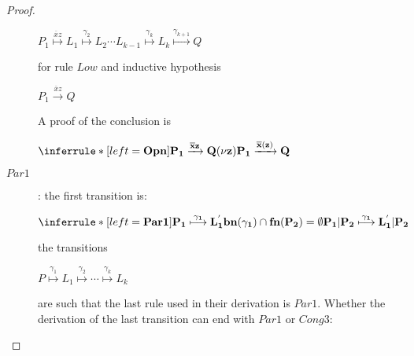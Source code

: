 \begin{proposition}
\begin{proof}
\begin{description}
\begin{center}
		  $P_{1} \stackrel{\overline{x}z}{\longmapsto} L_{1} \stackrel{\gamma_{2}}{\longmapsto} L_{2} \cdots L_{k-1} \stackrel{\gamma_{k}}{\longmapsto} L_{k}\stackrel{\gamma_{k+1}}{\longmapsto} Q$ 
		\end{center}
		for rule $Low$ and inductive hypothesis
		\begin{center}
		  $P_{1} \xrightarrow{\overline{x}z} Q$ 
		\end{center}
		A proof of the conclusion is
		\begin{center}
		  $\inferrule* [left=\bf{Opn}]{
		    P_{1} \xrightarrow{\overline{x}z} Q
		  }{
		    (\nu z)P_{1} \xrightarrow{\overline{x}(z)} Q
		  }$ 
		\end{center}
	      \item[$Par1$]: 
		the first transition is:
		\begin{center}
		  $\inferrule* [left=\bf{Par1}]{
			P_{1} \stackrel{\gamma_{1}}{\longmapsto} L_{1}^{'}
		      \\
			bn(\gamma_{1})\cap fn(P_{2})=\emptyset
		    }{
		      P_{1}|P_{2} \stackrel{\gamma_{1}}{\longmapsto} L_{1}^{'}|P_{2}
		  }$
		\end{center}
		the transitions 
		\begin{center}
		  $P \stackrel{\gamma_{1}}{\longmapsto} L_{1} \stackrel{\gamma_{2}}{\longmapsto} \cdots \stackrel{\gamma_{k}}{\longmapsto} L_{k}$ 
		\end{center}
		are such that the last rule used in their derivation is $Par1$. Whether the derivation of the last transition can end with $Par1$ or $Cong3$:
\end{description}
\end{proof}
\end{proposition}
